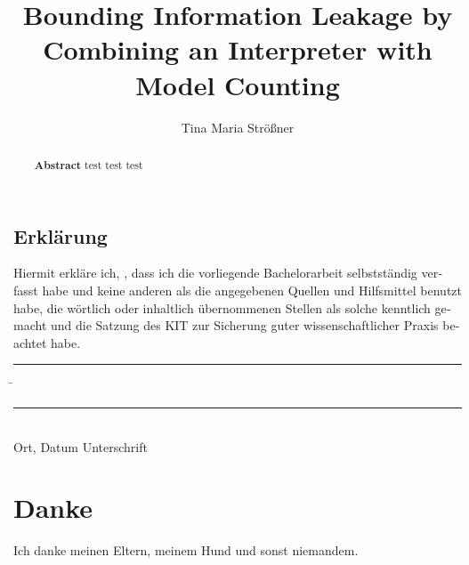 \documentclass[parskip=no,12pt,a4paper,twoside,headings=openright]{scrreprt}
\title{Bounding Information Leakage by Combining an Interpreter with Model Counting}
\author{Tina Maria Strößner}
\begin{document}
\begin{otherlanguage}{ngerman} %
\mytitlepage
\end{otherlanguage}

\begin{abstract}
\begin{center}\Huge\textbf{\textsf{Abstract}}
test test test
\end{center}
\vfill
\end{abstract}

\tableofcontents










\begin{otherlanguage}{ngerman}
\chapter*{Erklärung}
\pagestyle{empty}

  \vspace{20mm}
  Hiermit erkläre ich, \theauthor, dass ich die vorliegende Bachelorarbeit selbst\-ständig
verfasst habe und keine anderen als die angegebenen Quellen und Hilfsmittel
benutzt habe, die wörtlich oder inhaltlich übernommenen Stellen als solche kenntlich gemacht und
die Satzung des KIT zur Sicherung guter wissenschaftlicher Praxis beachtet habe.
  \vspace{20mm}
  \begin{tabbing}
  \rule{4cm}{.4pt}\hspace{1cm} \= \rule{7cm}{.4pt} \\
 Ort, Datum \> Unterschrift
  \end{tabbing}
\end{otherlanguage}

\chapter*{Danke}
\pagestyle{empty}

Ich danke meinen Eltern, meinem Hund und sonst niemandem.

\pagestyle{fancy}
\appendix


\end{document}
